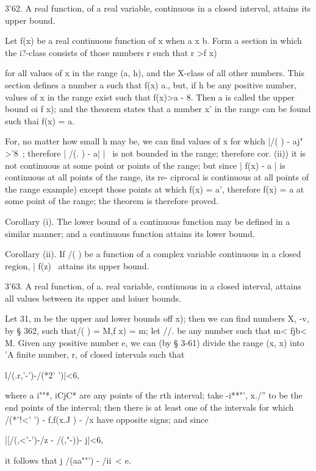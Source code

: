 3'62. A real function, of a real variable, continuous in a closed
interval, attains its upper bound.

Let f(x) be a real continuous function of x when a x b. Form a section
in which the i?-class consists of those numbers r such that r >f x)

%
%

for all values of x in the range (a, h), and the X-class of all other
numbers. This section defines a number a such that f(x) a., but, if h
be any positive number, values of x in the range exist such that
f(x)>a - 8. Then a is called the upper bound oi f x); and the theorem
states that a number x' in the range can be found such thai f(x) = a.

For, no matter how small h may be, we can find values of x for which
|/( ) - aj" >'8~; therefore | /(. ) - a| |~ is not bounded in the
range; therefore  cor. (ii)) it is not continuous at some point
or points of the range; but since | f(x) - a | is continuous at all
points of the range, its re- ciprocal is continuous at all points of
the range  example) except those points at which f(x) = a',
therefore f(x) = a at some point of the range; the theorem is
therefore proved.

Corollary (i). The lower bound of a continuous function may be defined
in a similar manner; and a continuous function attains its lower
bound.

Corollary (ii). If /( ) be a function of a complex variable continuous
in a closed region, | f(z) \ attains its upper bound.

3'63. A real function, of a. real variable, continuous in a closed
interval, attains all values between its upper and loiuer bounds.

Let 31, m be the upper and lower bounds off x); then we can find
numbers X, -v, by § 362, such that/( ) = M,f x) = m; let //. be any
number such that m< fjb< M. Given any positive number e, we can (by §
3-61) divide the range (x, x) into 'A finite number, r, of closed
intervals such that

l/(.r,'-')-/(*2' ')|<6,

where a i""*, iCjC* are any points of the rth interval; take -i**"',
x./'' to be the end points of the interval; then there is at least
one of the intervals for which /(*'!<' ') - f,f(x.J ) - /x have
opposite signs; and since

|[/(,<'-')-/z - /(,"-))- j|<6,

it follows that j /(aa""') - /ii\ < e.

